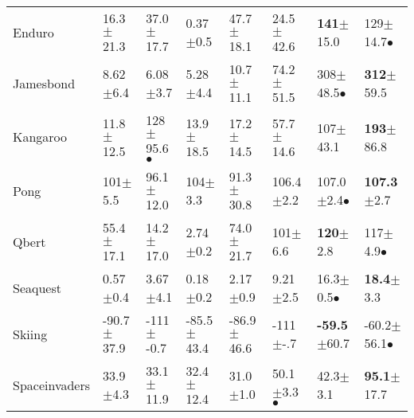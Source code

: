 \documentclass[accepted]{article}
\theoremstyle{plain}
\theoremstyle{definition}
\theoremstyle{remark}
\begin{document}
\begin{table*}[t]
\begin{tabular}{@{}llllllll@{}}
Enduro                           & 16.3\tiny$\pm$21.3        & 37.0\tiny$\pm$17.7                    & \multicolumn{1}{l|}{0.37\tiny$\pm$0.5}   & \multicolumn{1}{l|}{47.7\tiny$\pm$18.1}  & 24.5\tiny$\pm$42.6                    & \textbf{141}\tiny$\pm$15.0             & 129\tiny$\pm$14.7\normalsize$\bullet$   \\
Jamesbond                        & 8.62\tiny$\pm$6.4         & 6.08\tiny$\pm$3.7                     & \multicolumn{1}{l|}{5.28\tiny$\pm$4.4}   & \multicolumn{1}{l|}{10.7\tiny$\pm$11.1}  & 74.2\tiny$\pm$51.5                    & 308\tiny$\pm$48.5\normalsize$\bullet$  & \textbf{312}\tiny$\pm$59.5              \\
Kangaroo                         & 11.8\tiny$\pm$12.5        & 128\tiny$\pm$95.6\normalsize$\bullet$ & \multicolumn{1}{l|}{13.9\tiny$\pm$18.5}  & \multicolumn{1}{l|}{17.2\tiny$\pm$14.5}  & 57.7\tiny$\pm$14.6                    & 107\tiny$\pm$43.1                      & \textbf{193}\tiny$\pm$86.8              \\
Pong                             & 101\tiny$\pm$5.5          & 96.1\tiny$\pm$12.0                    & \multicolumn{1}{l|}{104\tiny$\pm$3.3}    & \multicolumn{1}{l|}{91.3\tiny$\pm$30.8}  & 106.4\tiny$\pm$2.2                    & 107.0\tiny$\pm$2.4\normalsize$\bullet$ & \textbf{107.3}\tiny$\pm$2.7             \\
Qbert                            & 55.4\tiny$\pm$17.1        & 14.2\tiny$\pm$17.0                    & \multicolumn{1}{l|}{2.74\tiny$\pm$0.2}   & \multicolumn{1}{l|}{74.0\tiny$\pm$21.7}  & 101\tiny$\pm$6.6                      & \textbf{120}\tiny$\pm$2.8              & 117\tiny$\pm$4.9\normalsize$\bullet$    \\
Seaquest                         & 0.57\tiny$\pm$0.4         & 3.67\tiny$\pm$4.1                     & \multicolumn{1}{l|}{0.18\tiny$\pm$0.2}   & \multicolumn{1}{l|}{2.17\tiny$\pm$0.9}   & 9.21\tiny$\pm$2.5                     & 16.3\tiny$\pm$0.5\normalsize$\bullet$  & \textbf{18.4}\tiny$\pm$3.3              \\
Skiing                           & -90.7\tiny$\pm$37.9       & -111\tiny$\pm$-0.7                    & \multicolumn{1}{l|}{-85.5\tiny$\pm$43.4} & \multicolumn{1}{l|}{-86.9\tiny$\pm$46.6} & -111\tiny$\pm$-.7                     & \textbf{-59.5}\tiny$\pm$60.7           & -60.2\tiny$\pm$56.1\normalsize$\bullet$ \\
Spaceinvaders                    & 33.9\tiny$\pm$4.3         & 33.1\tiny$\pm$11.9                    & \multicolumn{1}{l|}{32.4\tiny$\pm$12.4}  & \multicolumn{1}{l|}{31.0\tiny$\pm$1.0}   & 50.1\tiny$\pm$3.3\normalsize$\bullet$ & 42.3\tiny$\pm$3.1                      & \textbf{95.1}\tiny$\pm$17.7             \\

\end{tabular}
\end{table*}
\end{document}
